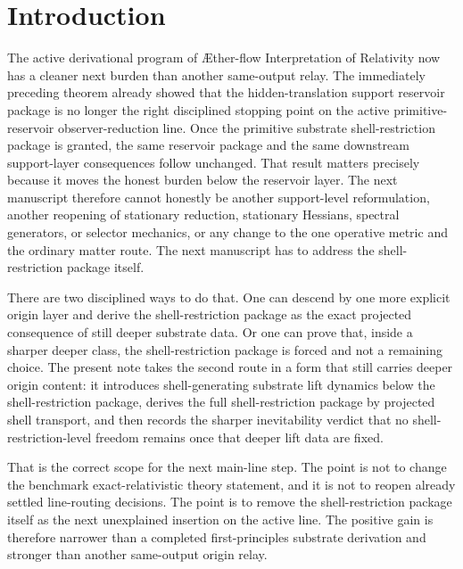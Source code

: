 \documentclass[11pt]{article}
\newcommand{\Aflow}{\AE{}ther-flow}
\newcommand{\TheoryName}{\Aflow{} Interpretation of Relativity}
\begin{document}
\section{Introduction}

The active derivational program of \TheoryName{} now has a cleaner next burden than another same-output relay. The immediately preceding theorem already showed that the hidden-translation support reservoir package is no longer the right disciplined stopping point on the active primitive-reservoir observer-reduction line. Once the primitive substrate shell-restriction package is granted, the same reservoir package and the same downstream support-layer consequences follow unchanged. That result matters precisely because it moves the honest burden below the reservoir layer. The next manuscript therefore cannot honestly be another support-level reformulation, another reopening of stationary reduction, stationary Hessians, spectral generators, or selector mechanics, or any change to the one operative metric and the ordinary matter route. The next manuscript has to address the shell-restriction package itself.

There are two disciplined ways to do that. One can descend by one more explicit origin layer and derive the shell-restriction package as the exact projected consequence of still deeper substrate data. Or one can prove that, inside a sharper deeper class, the shell-restriction package is forced and not a remaining choice. The present note takes the second route in a form that still carries deeper origin content: it introduces shell-generating substrate lift dynamics below the shell-restriction package, derives the full shell-restriction package by projected shell transport, and then records the sharper inevitability verdict that no shell-restriction-level freedom remains once that deeper lift data are fixed.

That is the correct scope for the next main-line step. The point is not to change the benchmark exact-relativistic theory statement, and it is not to reopen already settled line-routing decisions. The point is to remove the shell-restriction package itself as the next unexplained insertion on the active line. The positive gain is therefore narrower than a completed first-principles substrate derivation and stronger than another same-output origin relay.
\end{document}
